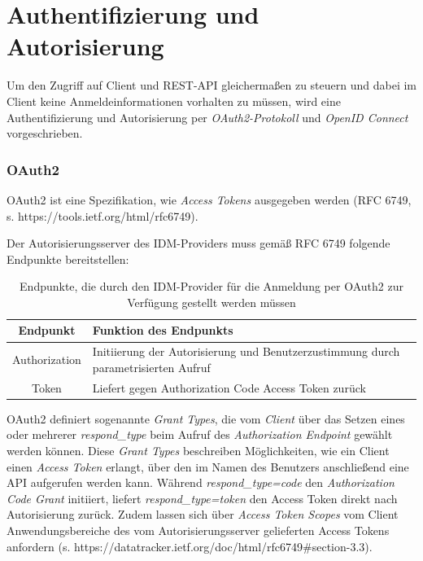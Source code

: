 \chapter{Authentifizierung und Autorisierung}
Um den Zugriff auf Client und REST-API gleichermaßen zu steuern und dabei im Client keine Anmeldeinformationen vorhalten zu müssen, wird eine Authentifizierung und Autorisierung per \textit{OAuth2-Protokoll} und \textit{OpenID Connect} vorgeschrieben.

\subsection{OAuth2}
\label{auth:oauth2}

OAuth2 ist eine Spezifikation, wie \textit{Access Tokens} ausgegeben werden (RFC 6749, s. https://tools.ietf.org/html/rfc6749). 

Der Autorisierungsserver des IDM-Providers muss gemäß RFC 6749 folgende Endpunkte bereitstellen:

\begin{table}[htb]
    \begin{tabularx}{\textwidth}{|c|X|}
        \hline
\textbf{Endpunkt} & \textbf{Funktion des Endpunkts} \\ \hline
Authorization & Initiierung der Autorisierung und Benutzerzustimmung durch parametrisierten Aufruf \\ \hline
Token & Liefert gegen Authorization Code Access Token zurück \\ \hline
    \end{tabularx}

        \caption{Endpunkte, die durch den IDM-Provider für die Anmeldung per OAuth2 zur Verfügung gestellt werden müssen}
        \label{tab:auth:endpoints}
\end{table}

OAuth2 definiert sogenannte \textit{Grant Types}, die vom \textit{Client} über das Setzen eines oder mehrerer \textit{respond_type} beim Aufruf des \textit{Authorization Endpoint} gewählt werden können. 
Diese \textit{Grant Types} beschreiben Möglichkeiten, wie ein Client einen \textit{Access Token} erlangt, über den im Namen des Benutzers anschließend eine API aufgerufen werden kann. 
Während \textit{respond_type=code} den \textit{Authorization Code Grant} initiiert, liefert \textit{respond_type=token} den Access Token direkt nach Autorisierung zurück. 
Zudem lassen sich über \textit{Access Token Scopes} vom Client Anwendungsbereiche des vom Autorisierungsserver gelieferten Access Tokens anfordern (s. https://datatracker.ietf.org/doc/html/rfc6749#section-3.3).

